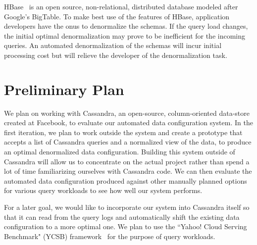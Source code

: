 \documentclass[10pt]{article}
\begin{document}
HBase~\cite{hbaseBook} is an open source, non-relational, distributed database modeled after Google's BigTable. To make best use of the features
of HBase, application developers have the onus to denormalize the schemas. If the query load changes, the initial optimal denormalization may
prove to be inefficient for the incoming queries. An automated denormalization of the schemas will incur initial processing cost but will relieve
the developer of the denormalization task.

\section{Preliminary Plan}
We plan on working with Cassandra, an open-source, column-oriented data-store created at Facebook, to evaluate our automated data configuration
system. In the first iteration, we plan to work outside the system and create a prototype that accepts a list of Cassandra queries and a normalized
view of the data, to produce an optimal denormalized data configuration. Building this system outside of Cassandra will allow us to concentrate on 
the actual project rather than spend a lot of time familiarizing ourselves with Cassandra code. We can then evaluate the automated data configuration 
produced against other manually planned options for various query workloads to see how well our system performs.

For a later goal, we would like to incorporate our system into Cassandra itself so that it can read from the query logs and automatically shift 
the existing data configuration to a more optimal one. We plan to use the ``Yahoo! Cloud Serving Benchmark" (YCSB) framework~\cite{ycsb} for the
purpose of query workloads.



\end{document}
